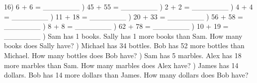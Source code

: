 \documentclass{article}%
\begin{document}
16) 6 + 6 = \_\_\_\_\_\_\_%
\newline%
\newline%
) 45 + 55 = \_\_\_\_\_\_\_%
\newline%
\newline%
) 2 + 2 = \_\_\_\_\_\_\_%
\newline%
\newline%
) 4 + 4 = \_\_\_\_\_\_\_%
\newline%
\newline%
) 11 + 18 = \_\_\_\_\_\_\_%
\newline%
\newline%
) 20 + 33 = \_\_\_\_\_\_\_%
\newline%
\newline%
) 56 + 58 = \_\_\_\_\_\_\_%
\newline%
\newline%
) 8 + 8 = \_\_\_\_\_\_\_%
\newline%
\newline%
) 62 + 78 = \_\_\_\_\_\_\_%
\newline%
\newline%
) 10 + 19 = \_\_\_\_\_\_\_%
\newline%
\newline%
) Sam has 1 books. Sally has 1 more books than Sam. How many books does Sally have?%
\newline%
\newline%
) Michael has 34 bottles. Bob has 52 more bottles than Michael. How many bottles does Bob have?%
\newline%
\newline%
) Sam has 5 marbles. Alex has 18 more marbles than Sam. How many marbles does Alex have?%
\newline%
\newline%
) James has 14 dollars. Bob has 14 more dollars than James. How many dollars does Bob have?%
\end{document}
